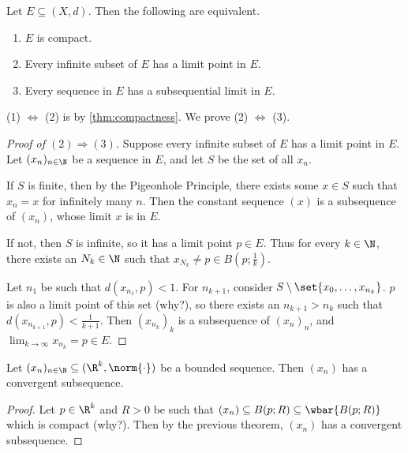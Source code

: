 \begin{theorem} \label{thm:compact:subsequential_limit}
    Let $E \subseteq (X, d)$.
    Then the following are equivalent.
    \begin{enumerate}[label=(\arabic*)]
        \item $E$ is compact.
        \item Every infinite subset of $E$ has a limit point in $E$.
        \item Every sequence in $E$ has a subsequential limit in $E$.
    \end{enumerate}
\end{theorem}
(1) $\iff$ (2) is by \cref{thm:compactness}.
We prove (2) $\iff$ (3).
\begin{proof}[Proof of $(2) \Rightarrow (3)$]
    Suppose every infinite subset of $E$ has a limit point in $E$.
    Let $(x_n)_{n \in \N}$ be a sequence in $E$, and let $S$ be the set of
    all $x_n$.

    If $S$ is finite, then by the Pigeonhole Principle, there exists
    some $x \in S$ such that $x_n = x$ for infinitely many $n$.
    Then the constant sequence $(x)$ is a subsequence of $(x_n)$, whose
    limit $x$ is in $E$.

    If not, then $S$ is infinite, so it has a limit point $p \in E$.
    Thus for every $k \in \N$, there exists an $N_k \in \N$ such that
    $x_{N_k} \ne p \in B(p; \frac1k)$.

    Let $n_1$ be such that $d(x_{n_1}, p) < 1$.
    For $n_{k+1}$, consider $S \setminus \set{x_0, \ldots, x_{n_k}}$.
    $p$ is also a limit point of this set (\textcolor{exercise}{why?}),
    so there exists an $n_{k+1} > n_k$ such that $d(x_{n_{k+1}}, p)
    < \frac1{k+1}$.
    Then $(x_{n_k})_k$ is a subsequence of $(x_n)_n$, and
    $\lim_{k \to \infty} x_{n_k} = p \in E$.
\end{proof}
\begin{corollary}
    Let $(x_n)_{n \in \N} \subseteq (\R^k, \norm{\cdot})$ be a bounded
    sequence.
    Then $(x_n)$ has a convergent subsequence.
\end{corollary}
\begin{proof}
    Let $p \in \R^k$ and $R > 0$ be such that $(x_n) \subseteq B(p; R)
    \subseteq \wbar{B(p; R)}$ which is compact (\textcolor{exercise}{why?}).
    Then by the previous theorem, $(x_n)$ has a convergent subsequence.
\end{proof}
